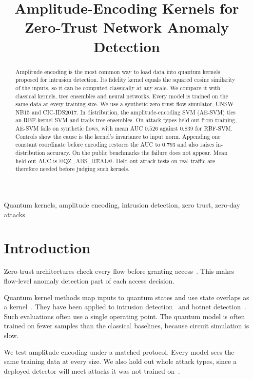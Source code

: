 \documentclass[conference,10pt]{IEEEtran}
\title{Amplitude-Encoding Kernels for Zero-Trust Network Anomaly Detection}
\author{
  \IEEEauthorblockN{Arnav Kapoor}
  \IEEEauthorblockA{Department of Computer Science and Engineering\\
  \textit{Indian Institute of Science Education and Research Bhopal}\\
  Bhopal, India\\
  arnavkapoor23@iiserb.ac.in}
}
\begin{document}
\maketitle

\begin{abstract}
Amplitude encoding is the most common way to load data into quantum kernels
proposed for intrusion detection. Its fidelity kernel equals the squared cosine
similarity of the inputs, so it can be computed classically at any scale. We
compare it with classical kernels, tree ensembles and neural networks. Every
model is trained on the same data at every training size. We use a synthetic
zero-trust flow simulator, UNSW-NB15 and CIC-IDS2017. In distribution, the
amplitude-encoding SVM (AE-SVM) ties an RBF-kernel SVM and trails tree
ensembles. On attack types held out from training, AE-SVM fails on synthetic
flows, with mean AUC $0.526$ against $0.839$ for RBF-SVM. Controls show the cause
is the kernel's invariance to input norm. Appending one constant coordinate
before encoding restores the AUC to $0.793$ and also raises in-distribution
accuracy. On the public benchmarks the failure does not appear. Mean held-out AUC
is @QZ_ABS_REAL@. Held-out-attack tests on real traffic are therefore needed
before judging such kernels.
\end{abstract}

\begin{IEEEkeywords}
Quantum kernels, amplitude encoding, intrusion detection, zero trust, zero-day attacks
\end{IEEEkeywords}

\section{Introduction}

Zero-trust architectures check every flow before granting access~\cite{rose2020zero,syed2022zero}.
This makes flow-level anomaly detection part of each access decision.

Quantum kernel methods map inputs to quantum states and use state overlaps as a
kernel~\cite{havlicek2019supervised,schuld2021machine}. They have been applied to
intrusion detection~\cite{kalinin2023security} and botnet
detection~\cite{suryotrisongko2022evaluating}. Such evaluations often use a single
operating point. The quantum model is often trained on fewer samples than the
classical baselines, because circuit simulation is slow.

We test amplitude encoding under a matched protocol. Every model sees the same
training data at every size. We also hold out whole attack types, since a
deployed detector will meet attacks it was not trained on~\cite{sommer2010outside}.
\end{document}
